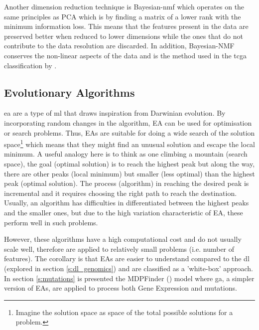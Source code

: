 Another dimension reduction technique is Bayesian-\acrfull{nmf} which operates on the same principles as PCA which is by finding a matrix of a lower rank with the minimum information loss. This means that the features present in the data are preserved better when reduced to lower dimensions while the ones that do not contribute to the data resolution are discarded. In addition, Bayesian-NMF conserves the non-linear aspects of the data and is the method used in the \acrfull{tcga} classification by \citet{Robertson2017-mg}. 



\subsection{Evolutionary Algorithms} \label{s:ea_overiew}


\acrlong{ea} are a type of \acrshort{ml} that draws inspiration from Darwinian evolution. By incorporating random changes in the algorithm, EA can be used for optimisation or search problems. Thus, EAs are suitable for doing a wide search of the solution space\footnote{Imagine the solution space as space of the total possible solutions for a problem.} which means that they might find an unusual solution and escape the local minimum. A useful analogy here is to think as one climbing a mountain (search space), the goal (optimal solution) is to reach the highest peak but along the way, there are other peaks (local minimum) but smaller (less optimal) than the highest peak (optimal solution). The process (algorithm) in reaching the desired peak is incremental and it requires choosing the right path to reach the destination. Usually, an algorithm has difficulties in differentiated between the highest peaks and the smaller ones, but due to the high variation characteristic of EA, these perform well in such problems.


However, these algorithms have a high computational cost and do not usually scale well, therefore are applied to relatively small problems (i.e. number of features). The corollary is that EAs are easier to understand compared to the  \acrfull{dl} (explored in section \ref{s:dl_genomics}) and are classified as a 'white-box' approach. In section \ref{s:mutations} is presented the MDPFinder (\citet{Zhao2012-wj}) model where \acrfull{ga}, a simpler version of EAs, are applied to process both Gene Expression and mutations.

